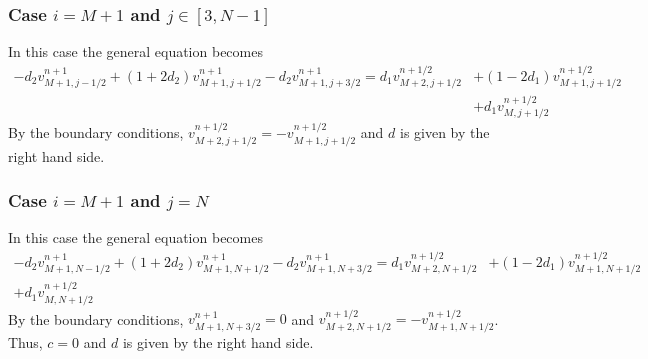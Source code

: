\subsubsection*{Case $i=M+1$ and $j\in[3,N-1]$}
In this case the general equation becomes
\begin{align*}
-d_2v_{M+1,j-1/2}^{n+1}+(1+2d_2)v_{M+1,j+1/2}^{n+1}-d_2v_{M+1,j+3/2}^{n+1}=d_1v_{M+2,j+1/2}^{n+1/2}&+(1-2d_1)v_{M+1,j+1/2}^{n+1/2}\\&+d_1v_{M,j+1/2}^{n+1/2}
\end{align*}
By the boundary conditions, $v_{M+2,j+1/2}^{n+1/2}=-v_{M+1,j+1/2}^{n+1/2}$ and $d$ is given by the right hand side.

\subsubsection*{Case $i=M+1$ and $j=N$}
In this case the general equation becomes
\begin{align*}
-d_2v_{M+1,N-1/2}^{n+1}+(1+2d_2)v_{M+1,N+1/2}^{n+1}-d_2v_{M+1,N+3/2}^{n+1}=d_1v_{M+2,N+1/2}^{n+1/2}&+(1-2d_1)v_{M+1,N+1/2}^{n+1/2}\\+d_1v_{M,N+1/2}^{n+1/2}
\end{align*}
By the boundary conditions, $v_{M+1,N+3/2}^{n+1}=0$ and $v_{M+2,N+1/2}^{n+1/2}=-v_{M+1,N+1/2}^{n+1/2}$. Thus, $c=0$ and $d$ is given by the right hand side.